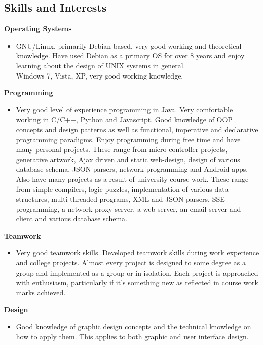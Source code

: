 \documentclass{res}
\begin{document}
\begin{resume}
     
\section{Skills and Interests} 
\vspace{0.1in}
 {\bf Operating Systems}
    \begin{itemize} %
      \item[] GNU/Linux, primarily Debian based, very good working and theoretical knowledge. Have used Debian as a primary OS for over 8 years and enjoy learning about the design of UNIX systems in general.\\
        Windows 7, Vista, XP, very good working knowledge.
      \end{itemize}
{\bf Programming} 
       \begin{itemize}
        \item[] Very good level of experience programming in Java. Very comfortable working in C/C++, Python and Javascript. Good knowledge of OOP concepts and design patterns as well as functional, imperative and declarative programming paradigms. Enjoy programming during free time and have many personal projects. These range from micro-controller projects, generative artwork, Ajax driven and static web-design, design of various database schema, JSON parsers, network programming and Android apps.\\
        Also have many projects as a result of university course work. These range from simple compilers, logic puzzles, implementation of various data structures, multi-threaded programs, XML and JSON parsers, SSE programming, a network proxy server, a web-server, an email server and client and various database schema.
    \end{itemize}

    {\bf  Teamwork} 
        \begin{itemize}
        \item[]  Very good teamwork skills. Developed teamwork skills during work experience and college projects. Almost every project is designed to some degree as a group and implemented as a group or in isolation. Each project is approached with enthusiasm, particularly if it's something new as reflected in course work marks achieved.
       \end{itemize} 

  {\bf Design} 
        \begin{itemize}
        \item[] Good knowledge of graphic design concepts and the technical knowledge on how to apply them. This applies to both graphic and user interface design.
       \end{itemize}


\end{resume}
\end{document}
